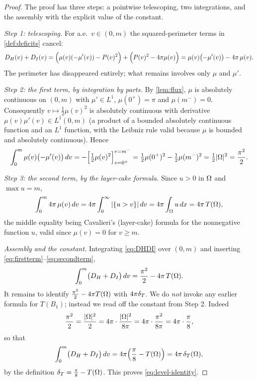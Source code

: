 \begin{proof}
The proof has three steps: a pointwise telescoping, two integrations, and
the assembly with the explicit value of the constant.

\emph{Step 1: telescoping.} For a.e.\ $v\in(0,m)$ the squared-perimeter terms
in \cref{def:deficits} cancel:
\begin{equation}\label{eq:DHDI}
   D_H(v)+D_I(v)
   =\Bigl(\mu(v)(-\mu'(v))-P(v)^2\Bigr)+\Bigl(P(v)^2-4\pi\mu(v)\Bigr)
   =\mu(v)\bigl(-\mu'(v)\bigr)-4\pi\,\mu(v).
\end{equation}
The perimeter has disappeared entirely; what remains involves only $\mu$ and
$\mu'$.

\emph{Step 2: the first term, by integration by parts.} By \cref{lem:flux},
$\mu$ is absolutely continuous on $(0,m)$ with $\mu'\in L^1$, $\mu(0^+)=\pi$
and $\mu(m^-)=0$. Consequently $v\mapsto\tfrac12\mu(v)^2$ is absolutely
continuous with derivative $\mu(v)\mu'(v)\in L^1(0,m)$ (a product of a
bounded absolutely continuous function and an $L^1$ function, with the
Leibniz rule valid because $\mu$ is bounded and absolutely continuous).
Hence
\begin{equation}\label{eq:firstterm}
   \int_0^m\mu(v)\bigl(-\mu'(v)\bigr)\,dv
   =-\Bigl[\tfrac12\mu(v)^2\Bigr]_{v=0^+}^{v=m^-}
   =\tfrac12\mu(0^+)^2-\tfrac12\mu(m^-)^2
   =\tfrac12|\Omega|^2=\frac{\pi^2}{2}.
\end{equation}

\emph{Step 3: the second term, by the layer-cake formula.} Since $u>0$ in
$\Omega$ and $\max u=m$,
\begin{equation}\label{eq:secondterm}
   \int_0^m 4\pi\,\mu(v)\,dv
   =4\pi\int_0^\infty|\{u>v\}|\,dv
   =4\pi\int_\Omega u\,dx=4\pi\,T(\Omega),
\end{equation}
the middle equality being Cavalieri's (layer-cake) formula for the
nonnegative function $u$, valid since $\mu(v)=0$ for $v\ge m$.

\emph{Assembly and the constant.} Integrating \eqref{eq:DHDI} over $(0,m)$
and inserting \eqref{eq:firstterm}--\eqref{eq:secondterm},
\[
   \int_0^m\bigl(D_H+D_I\bigr)\,dv
   =\frac{\pi^2}{2}-4\pi\,T(\Omega).
\]
It remains to identify $\frac{\pi^2}{2}-4\pi T(\Omega)$ with $4\pi\delta_T$. We do
\emph{not} invoke any earlier formula for $T(B_1)$; instead we read off the
constant from Step 2. Indeed
\[
   \frac{\pi^2}{2}=\frac{|\Omega|^2}{2}=4\pi\cdot\frac{|\Omega|^2}{8\pi}
   =4\pi\cdot\frac{\pi^2}{8\pi}=4\pi\cdot\frac{\pi}{8},
\]
so that
\[
   \int_0^m\bigl(D_H+D_I\bigr)\,dv
   =4\pi\Bigl(\frac{\pi}{8}-T(\Omega)\Bigr)=4\pi\,\delta_T(\Omega),
\]
by the definition $\delta_T=\frac\pi8-T(\Omega)$. This proves
\eqref{eq:level-identity}.


\end{proof}

